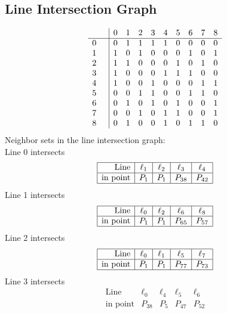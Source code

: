 \documentclass{article}
\begin{document}
{\subsection*{Line Intersection Graph}
{\arraycolsep=1pt
$$
\begin{array}{rr|*{9}r}
 &  & 0 & 1 & 2 & 3 & 4 & 5 & 6 & 7 & 8\\
\hline
0 &  & 0 & 1 & 1 & 1 & 1 & 0 & 0 & 0 & 0\\
1 &  & 1 & 0 & 1 & 0 & 0 & 0 & 1 & 0 & 1\\
2 &  & 1 & 1 & 0 & 0 & 0 & 1 & 0 & 1 & 0\\
3 &  & 1 & 0 & 0 & 0 & 1 & 1 & 1 & 0 & 0\\
4 &  & 1 & 0 & 0 & 1 & 0 & 0 & 0 & 1 & 1\\
5 &  & 0 & 0 & 1 & 1 & 0 & 0 & 1 & 1 & 0\\
6 &  & 0 & 1 & 0 & 1 & 0 & 1 & 0 & 0 & 1\\
7 &  & 0 & 0 & 1 & 0 & 1 & 1 & 0 & 0 & 1\\
8 &  & 0 & 1 & 0 & 0 & 1 & 0 & 1 & 1 & 0\\
\end{array}
$$
}%
Neighbor sets in the line intersection graph:\\
Line 0 intersects 
$$
\begin{array}{|r*{4}{|c}|}
\hline
\mbox{Line}  & \ell_{1} & \ell_{2} & \ell_{3} & \ell_{4}\\
\hline
\mbox{in point}  & P_{1} & P_{1} & P_{38} & P_{42}\\
\hline
\end{array}
$$
Line 1 intersects 
$$
\begin{array}{|r*{4}{|c}|}
\hline
\mbox{Line}  & \ell_{0} & \ell_{2} & \ell_{6} & \ell_{8}\\
\hline
\mbox{in point}  & P_{1} & P_{1} & P_{65} & P_{57}\\
\hline
\end{array}
$$
Line 2 intersects 
$$
\begin{array}{|r*{4}{|c}|}
\hline
\mbox{Line}  & \ell_{0} & \ell_{1} & \ell_{5} & \ell_{7}\\
\hline
\mbox{in point}  & P_{1} & P_{1} & P_{77} & P_{73}\\
\hline
\end{array}
$$
Line 3 intersects 
$$
\begin{array}{|r*{4}{|c}|}
\hline
\mbox{Line}  & \ell_{0} & \ell_{4} & \ell_{5} & \ell_{6}\\
\hline
\mbox{in point}  & P_{38} & P_{5} & P_{47} & P_{52}\\

\end{array}$$}
\end{document}
